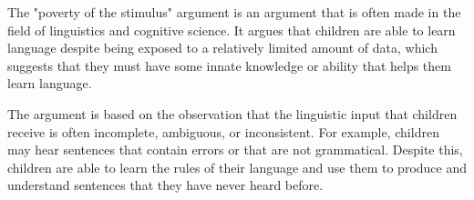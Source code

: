 The "poverty of the stimulus" argument is an argument that is often made in the field of linguistics and cognitive science. It argues that children are able to learn language despite being exposed to a relatively limited amount of data, which suggests that they must have some innate knowledge or ability that helps them learn language.

The argument is based on the observation that the linguistic input that children receive is often incomplete, ambiguous, or inconsistent. For example, children may hear sentences that contain errors or that are not grammatical. Despite this, children are able to learn the rules of their language and use them to produce and understand sentences that they have never heard before.


